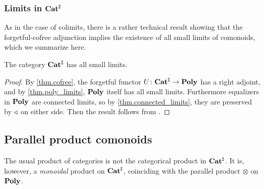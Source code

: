 \documentclass[Book-Poly]{subfiles}
\begin{document}
\subsubsection{Limits in $\mathbf{Cat}^\sharp$}

As in the case of colimits, there is a rather technical result showing that the forgetful-cofree adjunction implies the existence of all small limits of comonoids, which we summarize here.

\begin{corollary} \label{cor.comon_compl}
The category $\mathbf{Cat}^\sharp$ has all small limits.
\end{corollary}
\begin{proof}
By \cref{thm.cofree}, the forgetful functor $U\colon\mathbf{Cat}^\sharp\to\mathbf{Poly}$ has a right adjoint, and by \cref{thm.poly_limits}, $\mathbf{Poly}$ itself has all small limits.
Furthermore equalizers in $\mathbf{Poly}$ are connected limits, so by \cref{thm.connected_limits}, they are preserved by $\mathbin{\triangleleft}$ on either side.
Then the result follows from \cite[Fact~3.4]{porst2019colimits}.
\end{proof}


\subsection{Parallel product comonoids}

The usual product of categories is not the categorical product in $\mathbf{Cat}^\sharp$. %
It is, however, a \emph{monoidal} product on $\mathbf{Cat}^\sharp$, coinciding with the parallel product $\otimes$ on $\mathbf{Poly}$.
\end{document}
